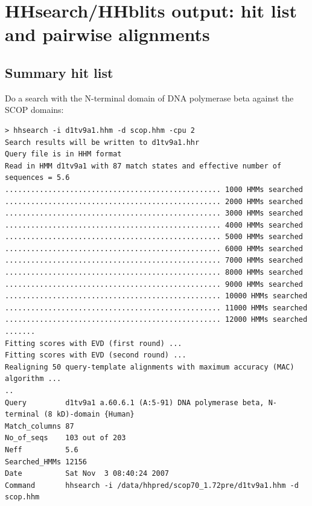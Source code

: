 \documentclass[11pt,a4paper]{article}
\begin{document}
\section{HHsearch/HHblits output: hit list and pairwise alignments}

\subsection{Summary hit list}

Do a search with the N-terminal domain of DNA polymerase beta against the SCOP domains:


\scriptsize\begin{verbatim}
> hhsearch -i d1tv9a1.hhm -d scop.hhm -cpu 2
Search results will be written to d1tv9a1.hhr
Query file is in HHM format
Read in HMM d1tv9a1 with 87 match states and effective number of sequences = 5.6
.................................................. 1000 HMMs searched
.................................................. 2000 HMMs searched
.................................................. 3000 HMMs searched
.................................................. 4000 HMMs searched
.................................................. 5000 HMMs searched
.................................................. 6000 HMMs searched
.................................................. 7000 HMMs searched
.................................................. 8000 HMMs searched
.................................................. 9000 HMMs searched
.................................................. 10000 HMMs searched
.................................................. 11000 HMMs searched
.................................................. 12000 HMMs searched
.......
Fitting scores with EVD (first round) ...
Fitting scores with EVD (second round) ...
Realigning 50 query-template alignments with maximum accuracy (MAC) algorithm ...
..
Query         d1tv9a1 a.60.6.1 (A:5-91) DNA polymerase beta, N-terminal (8 kD)-domain {Human} 
Match_columns 87
No_of_seqs    103 out of 203
Neff          5.6 
Searched_HMMs 12156
Date          Sat Nov  3 08:40:24 2007
Command       hhsearch -i /data/hhpred/scop70_1.72pre/d1tv9a1.hhm -d scop.hhm 


\end{verbatim}
\end{document}
